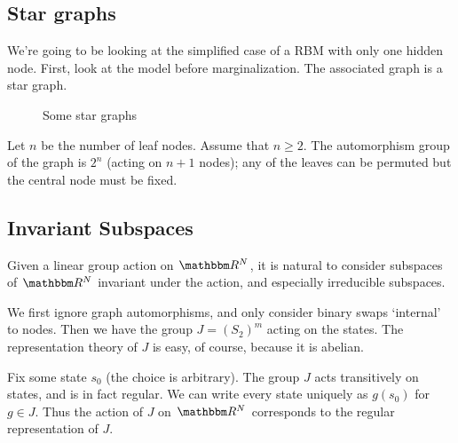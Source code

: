 \documentclass[12pt]{article}
\begin{document}
\subsection{Star graphs}
We're going to be looking at the simplified case of a RBM with only one hidden
node.  First, look at the model before marginalization.  The associated graph is
a star graph.
\begin{figure}[H]
    \centering
    \caption{Some star graphs}
\end{figure}
Let $n$ be the number of leaf nodes.  Assume that $n \ge 2$.  The automorphism
group of the graph is $2^n$ (acting on $n+1$ nodes); any of the leaves can be
permuted but the central node must be fixed.

\subsection{Invariant Subspaces}

Given a linear group action on $\R^N$, it is natural to consider subspaces of
$\R^N$ invariant under the action, and especially irreducible subspaces.

We first ignore graph automorphisms, and only consider binary swaps `internal'
to nodes.  Then we have the group $J = (S_2)^m$ acting on the states.  The
representation theory of $J$ is easy, of course, because it is abelian.

Fix some state $s_0$ (the choice is arbitrary).  The group $J$ acts transitively
on states, and is in fact regular.  We can write every state uniquely as
$g(s_0)$ for $g \in J$.  Thus the action of $J$ on $\R^N$ corresponds to the
regular representation of $J$.
\end{document}
